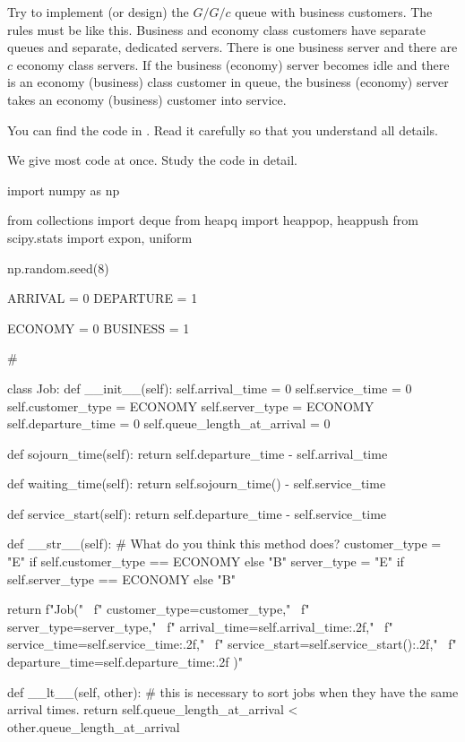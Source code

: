 \begin{exercise}
  Try to implement (or design) the $G/G/c$ queue with business customers. The rules must be like this. Business and economy class customers have separate queues and separate, dedicated servers. There is one business server and there are $c$ economy class servers. If the business (economy) server becomes  idle and there is an economy (business) class customer in queue, the business (economy) server takes an economy (business) customer into service.

You can find the code in . Read it carefully so that you understand all details. 
\begin{solution}
We give most code at once. Study the code in detail.
\begin{pyverbatim}
import numpy as np

from collections import deque
from heapq import heappop, heappush
from scipy.stats import expon, uniform

np.random.seed(8)

ARRIVAL = 0
DEPARTURE = 1

ECONOMY = 0
BUSINESS = 1

# %


class Job:
    def __init__(self):
        self.arrival_time = 0
        self.service_time = 0
        self.customer_type = ECONOMY
        self.server_type = ECONOMY
        self.departure_time = 0
        self.queue_length_at_arrival = 0

    def sojourn_time(self):
        return self.departure_time - self.arrival_time

    def waiting_time(self):
        return self.sojourn_time() - self.service_time

    def service_start(self):
        return self.departure_time - self.service_time

    def __str__(self):  # What do you think this method does?
        customer_type = "E" if self.customer_type == ECONOMY else "B"
        server_type = "E" if self.server_type == ECONOMY else "B"

        return f"Job(" \
               f" customer_type={customer_type}," \
               f" server_type={server_type}," \
               f" arrival_time={self.arrival_time:.2f}," \
               f" service_time={self.service_time:.2f}," \
               f" service_start={self.service_start():.2f}," \
               f" departure_time={self.departure_time:.2f} )"

    def __lt__(self, other):
        # this is necessary to sort jobs when they have the same arrival times.
        return self.queue_length_at_arrival < other.queue_length_at_arrival



\end{pyverbatim}
\end{solution}
\end{exercise}
